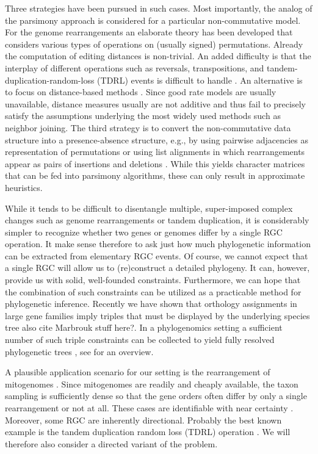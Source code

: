 \documentclass[smallextended]{svjour3}
\let\cite\citep
\newcommand{\TODO}[1]{\begingroup\color{red}#1\endgroup}
\begin{document}
Three strategies have been pursued in such cases. Most importantly, the
analog of the parsimony approach is considered for a particular
non-commutative model. For the genome rearrangements an elaborate theory has
been developed that considers various types of operations on (usually
signed) permutations. Already the computation of editing distances is
non-trivial. An added difficulty is that the interplay of different
operations such as reversals, transpositions, and
tandem-duplication-random-loss (TDRL) events is difficult to handle
\cite{Bernt:07a,Hartmann:16}. An alternative is to focus on distance-based
methods \cite{Wang:06}. Since good rate models are usually unavailable,
distance measures usually are not additive and thus fail to precisely
satisfy the assumptions underlying the most widely used methods such as
neighbor joining. The third strategy is to convert the non-commutative data
structure into a presence-absence structure, e.g., by using pairwise
adjacencies \cite{Tang:05} as representation of permutations or using list
alignments in which rearrangements appear as pairs of insertions and
deletions \cite{Fritzsch:06a}. While this yields character matrices that
can be fed into parsimony algorithms, these can only result in approximate
heuristics.

While it tends to be difficult to disentangle multiple, super-imposed
complex changes such as genome rearrangements or tandem duplication, it is
considerably simpler to recognize whether two genes or genomes differ by a
single RGC operation. It make sense therefore to ask just how much
phylogenetic information can be extracted from elementary RGC events. Of
course, we cannot expect that a single RGC will allow us to (re)construct a
detailed phylogeny. It can, however, provide us with solid, well-founded
constraints. Furthermore, we can hope that the combination of such
constraints can be utilized as a practicable method for phylogenetic
inference. Recently we have shown that orthology assignments in large gene
families imply triples that must be displayed by the underlying species
tree \cite{HernandezRosales:12a,Hellmuth:13a} \TODO{also cite Marbrouk
  stuff here?}. In a phylogenomics setting a sufficient number of such
triple constraints can be collected to yield fully resolved phylogenetic
trees \cite{Hellmuth:15a}, see \citet{HW:16b} for an overview.

A plausible application scenario for our setting is the rearrangement of
mitogenomes \cite{Sankoff:82}. Since mitogenomes are readily and cheaply
available, the taxon sampling is sufficiently dense so that the gene orders
often differ by only a single rearrangement or not at all. These cases are
identifiable with near certainty \cite{Bernt:07a}. Moreover, some RGC are
inherently directional. Probably the best known example is the tandem
duplication random loss (TDRL) operation \cite{Chaudhuri:06}. We will
therefore also consider a directed variant of the problem.
\end{document}
